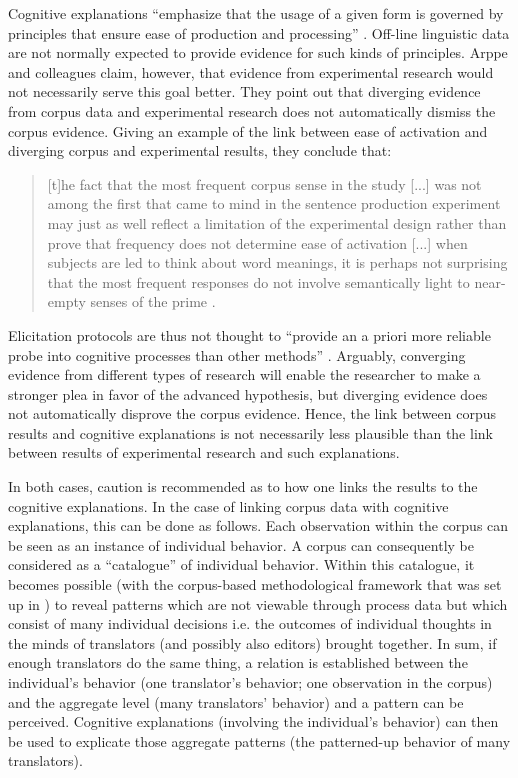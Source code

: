 Cognitive explanations “emphasize that the usage of a given form is governed by principles that ensure ease of production and processing” \citep[20]{arppe_cognitive_2010}. Off-line linguistic data are not normally expected to provide evidence for such kinds of principles. Arppe and colleagues claim, however, that evidence from experimental research would not necessarily serve this goal better. They point out that diverging evidence from corpus data and experimental research does not automatically dismiss the corpus evidence. Giving an example of the link between ease of activation and diverging corpus and experimental results, they conclude that: 

\begin{quote}
[t]he fact that the most frequent corpus sense in the study [...] was not among the first that came to mind in the sentence production experiment may just as well reflect a limitation of the experimental design rather than prove that frequency does not determine ease of activation [...] when subjects are led to think about word meanings, it is perhaps not surprising that the most frequent responses do not involve semantically light to near-empty senses of the prime \citep[11--12]{arppe_cognitive_2010}.
\end{quote}

Elicitation protocols are thus not thought to “provide an a priori more reliable probe into cognitive processes than other methods” \citep[12]{arppe_cognitive_2010}. Arguably, converging evidence from different types of research will enable the researcher to make a stronger plea in favor of the advanced hypothesis, but diverging evidence does not automatically disprove the corpus evidence. Hence, the link between corpus results and cognitive explanations is not necessarily less plausible than the link between results of experimental research and such explanations.

In both cases, caution is recommended as to how one links the results to the cognitive explanations. In the case of linking corpus data with cognitive explanations, this can be done as follows. Each observation within the corpus can be seen as an instance of individual behavior. A corpus can consequently be considered as a ``catalogue'' of individual behavior. Within this catalogue, it becomes possible (with the corpus-based methodological framework that was set up in ) to reveal patterns which are not viewable through process data but which consist of many individual decisions i.e. the outcomes of individual thoughts in the minds of translators (and possibly also editors) brought together. In sum, if enough translators do the same thing, a relation is established between the individual’s behavior (one translator’s behavior; one observation in the corpus) and the aggregate level (many translators’ behavior) and a pattern can be perceived. Cognitive explanations (involving the individual’s behavior) can then be used to explicate those aggregate patterns (the patterned-up behavior of many translators).

